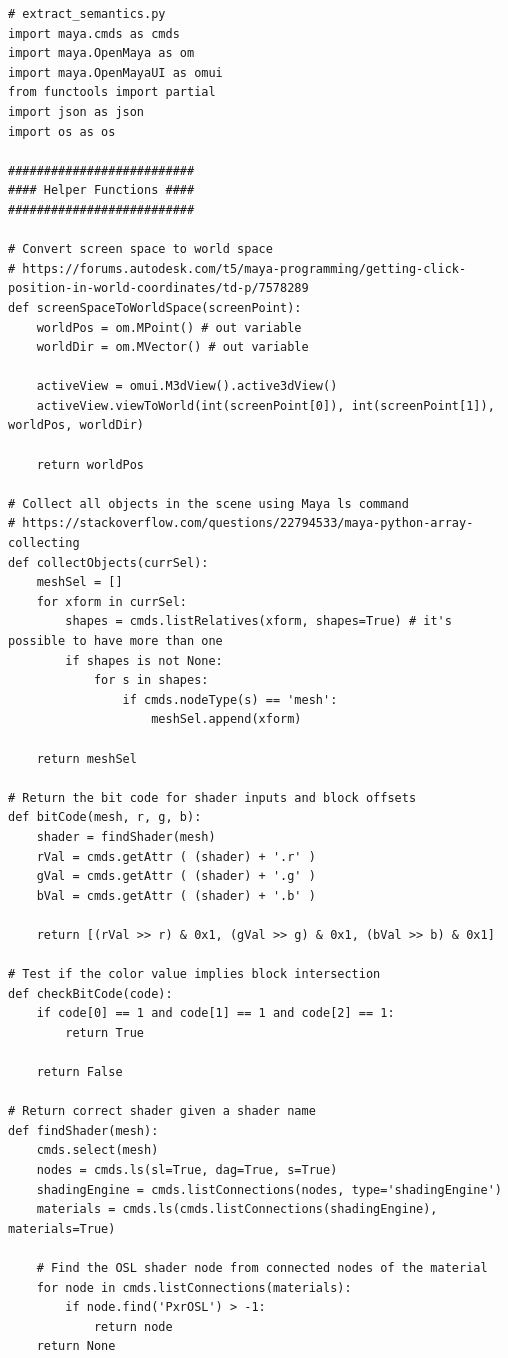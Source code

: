 \documentclass[conference]{IEEEtran}
\begin{document}
{{\bigskip

\begin{verbatim}
# extract_semantics.py
import maya.cmds as cmds
import maya.OpenMaya as om
import maya.OpenMayaUI as omui
from functools import partial
import json as json
import os as os

##########################
#### Helper Functions ####
##########################

# Convert screen space to world space
# https://forums.autodesk.com/t5/maya-programming/getting-click-position-in-world-coordinates/td-p/7578289
def screenSpaceToWorldSpace(screenPoint):
    worldPos = om.MPoint() # out variable
    worldDir = om.MVector() # out variable
    
    activeView = omui.M3dView().active3dView()
    activeView.viewToWorld(int(screenPoint[0]), int(screenPoint[1]), worldPos, worldDir)
    
    return worldPos

# Collect all objects in the scene using Maya ls command
# https://stackoverflow.com/questions/22794533/maya-python-array-collecting
def collectObjects(currSel):
    meshSel = []
    for xform in currSel:
        shapes = cmds.listRelatives(xform, shapes=True) # it's possible to have more than one
        if shapes is not None:
            for s in shapes:
                if cmds.nodeType(s) == 'mesh':
                    meshSel.append(xform)
  
    return meshSel
    
# Return the bit code for shader inputs and block offsets
def bitCode(mesh, r, g, b):
    shader = findShader(mesh)
    rVal = cmds.getAttr ( (shader) + '.r' )
    gVal = cmds.getAttr ( (shader) + '.g' )
    bVal = cmds.getAttr ( (shader) + '.b' ) 
    
    return [(rVal >> r) & 0x1, (gVal >> g) & 0x1, (bVal >> b) & 0x1]

# Test if the color value implies block intersection
def checkBitCode(code):
    if code[0] == 1 and code[1] == 1 and code[2] == 1:
        return True
        
    return False

# Return correct shader given a shader name
def findShader(mesh):
    cmds.select(mesh)
    nodes = cmds.ls(sl=True, dag=True, s=True)
    shadingEngine = cmds.listConnections(nodes, type='shadingEngine')
    materials = cmds.ls(cmds.listConnections(shadingEngine), materials=True)
    
    # Find the OSL shader node from connected nodes of the material
    for node in cmds.listConnections(materials):
        if node.find('PxrOSL') > -1:
            return node
    return None


\end{verbatim}}}
\end{document}
